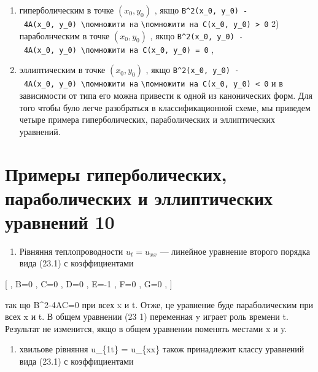 \documentclass[
  ukrainian,
]{article}
\providecommand{\tightlist}{%
  \setlength{\itemsep}{0pt}\setlength{\parskip}{0pt}}
\begin{document}
\begin{enumerate}
\def\labelenumi{\arabic{enumi})}
\item
  гиперболическим в точке \((x_0, y_0)\) , якщо
  \texttt{B\^{}2(x\_0,\ y\_0)\ -\ 4A(x\_0,\ y\_0)\ \textbackslash{}помножити\ на}
  \texttt{\textbackslash{}помножити\ на\ C(x\_0,\ y\_0)\ \textgreater{}\ 0}
  2) параболнческим в точке \((x_0, y_0)\) , якщо
  \texttt{B\^{}2(x\_0,\ y\_0)\ -\ 4A(x\_0,\ y\_0)\ \textbackslash{}помножити\ на\ C(x\_0,\ y\_0)\ =\ 0}
  ,
\item
  эллиптическим в точке \((x_0, y_0)\) , якщо
  \texttt{B\^{}2(x\_0,\ y\_0)\ -\ 4A(x\_0,\ y\_0)\ \textbackslash{}помножити\ на}
  \texttt{\textbackslash{}помножити\ на\ C(x\_0,\ y\_0)\ \textless{}\ 0}
  и в зависимости от типа его можна привести к одной из канонических
  форм. Для того чтобы було легче разобраться в классификационной схеме,
  мы приведем четыре примера гиперболических, параболических и
  эллиптических уравнений.
\end{enumerate}

\section{Примеры гиперболических, параболических и эллиптических
уравнений
10}\label{ux43fux440ux438ux43cux435ux440ux44b-ux433ux438ux43fux435ux440ux431ux43eux43bux438ux447ux435ux441ux43aux438ux445-ux43fux430ux440ux430ux431ux43eux43bux438ux447ux435ux441ux43aux438ux445-ux438-ux44dux43bux43bux438ux43fux442ux438ux447ux435ux441ux43aux438ux445-ux443ux440ux430ux432ux43dux435ux43dux438ux439-10}

\begin{enumerate}
\def\labelenumi{\arabic{enumi}.}
\tightlist
\item
  Рівняння теплопроводности \(u_t = u_{xx}\) --- линейное уравнение
  второго порядка вида (23.1) с коэффициентами
\end{enumerate}

{[} , B=0 , C=0 , D=0 , E=-1 , F=0 , G=0 , {]}

так що B\^{}2-4AC=0 при всех x и t. Отже, це уравнение буде
параболическим при всех x и t. В общем уравнении (23 1) переменная y
играет роль времени t. Результат не изменится, якщо в общем уравнении
поменять местами x и y.

\begin{enumerate}
\def\labelenumi{\arabic{enumi}.}
\setcounter{enumi}{1}
\tightlist
\item
  хвильове рівняння u\_\{1t\} = u\_\{xx\} також принадлежит классу
  уравнений вида (23.1) с коэффициентами
\end{enumerate}
\end{document}
